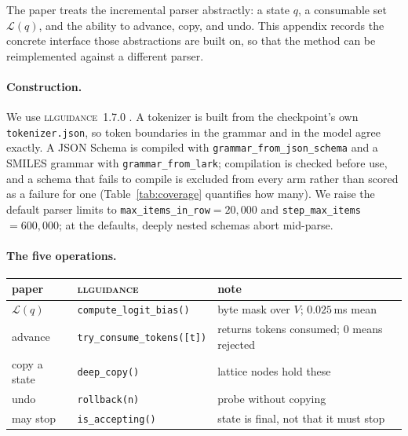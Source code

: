 \documentclass{article}
\begin{document}
The paper treats the incremental parser abstractly: a state $q$, a consumable
set $\mathcal{L}(q)$, and the ability to advance, copy, and undo. This appendix
records the concrete interface those abstractions are built on, so that the
method can be reimplemented against a different parser.

\paragraph{Construction.}
We use \textsc{llguidance}~1.7.0 \citep{microsoft2025llguidance}. A tokenizer is
built from the checkpoint's own \texttt{tokenizer.json}, so token boundaries in
the grammar and in the model agree exactly. A JSON Schema is compiled with
\texttt{grammar\_from\_json\_schema} and a SMILES grammar with
\texttt{grammar\_from\_lark}; compilation is checked before use, and a schema
that fails to compile is excluded from every arm rather than scored as a failure
for one (Table~\ref{tab:coverage} quantifies how many). We raise the default parser
limits to \texttt{max\_items\_in\_row}${=}20{,}000$ and
\texttt{step\_max\_items}${=}600{,}000$; at the defaults, deeply nested schemas
abort mid-parse.

\paragraph{The five operations.}
\begin{center}
\small
\begin{tabular}{lll}
\toprule
paper & \textsc{llguidance} & note \\
\midrule
$\mathcal{L}(q)$        & \texttt{compute\_logit\_bias()}    & byte mask over $V$; $0.025$\,ms mean \\
advance                 & \texttt{try\_consume\_tokens([t])} & returns tokens consumed; $0$ means rejected \\
copy a state            & \texttt{deep\_copy()}              & lattice nodes hold these \\
undo                    & \texttt{rollback(n)}               & probe without copying \\
may stop                & \texttt{is\_accepting()}           & state is final, not that it must stop \\
\bottomrule
\end{tabular}
\end{center}
\end{document}
